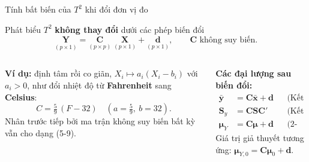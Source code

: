 \begin{frame}{Tính bất biến của \texorpdfstring{\(T^2\)}{T2} khi đổi đơn vị đo}
  \vspace{-0.1cm}
  \begin{block}{Phát biểu}
    \(T^2\) \textbf{không thay đổi} dưới các phép biến đổi
    \vspace{-0.15cm}
    \begin{equation*}
      \underset{(p\times1)}{\mathbf{Y}}
      = \underset{(p\times p)}{\mathbf{C}}\;
        \underset{(p\times1)}{\mathbf{X}}
      + \underset{(p\times1)}{\mathbf{d}},
      \qquad \mathbf{C} \text{ không suy biến.}
      \tag{5-9}
    \end{equation*}
  \end{block}
  \vspace{-0.05cm}
  \begin{columns}[T,onlytextwidth]
    \small
    \textbf{Ví dụ:} định tâm rồi co giãn,
    \(X_i \mapsto a_i(X_i-b_i)\) với \(a_i>0\), như đổi nhiệt độ từ \textbf{Fahrenheit} sang \textbf{Celsius}:
    \[
      C = \tfrac{5}{9}\,(F - 32)
      \quad (a = \tfrac{5}{9},\ b = 32).
    \]
    Nhân trước tiếp bởi ma trận không suy biến bất kỳ vẫn cho dạng (5-9).

    \small
    \textbf{Các đại lượng sau biến đổi:}
    \begin{align*}
      \bar{\mathbf{y}} &= \mathbf{C}\bar{\mathbf{x}} + \mathbf{d}
        && \text{(Kết quả 3.6)}\\
      \mathbf{S}_y &= \mathbf{C}\mathbf{S}\mathbf{C}'
        && \text{(Kết quả 3.6)}\\
      \boldsymbol{\mu}_Y &= \mathbf{C}\boldsymbol{\mu}+\mathbf{d}
        && \text{(2-24), (2-45)}
    \end{align*}
    Giá trị giả thuyết tương ứng: \(\boldsymbol{\mu}_{Y,0}=\mathbf{C}\boldsymbol{\mu}_0+\mathbf{d}\).
  \end{columns}
\end{frame}

